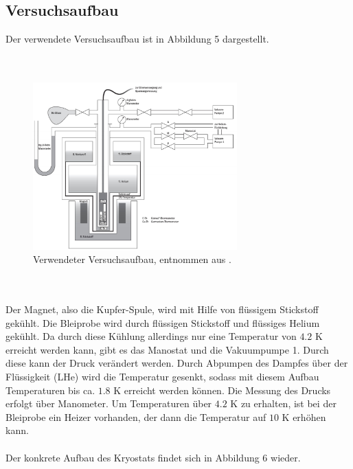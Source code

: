\documentclass[german,  %
parskip=full,  %
]{scrartcl}
\begin{document}
\subsection{Versuchsaufbau}
Der verwendete Versuchsaufbau ist in Abbildung 5 dargestellt.
\\\\\
\begin{figure}[h!]
\centering
\includegraphics[width=0.7\textwidth]{aufbau}
\caption{Verwendeter Versuchsaufbau, entnommen aus \cite{3}.}
\end{figure}
\\\\
Der Magnet, also die Kupfer-Spule, wird mit Hilfe von flüssigem Stickstoff gekühlt. Die Bleiprobe wird durch flüssigen Stickstoff und flüssiges Helium gekühlt. Da durch diese Kühlung allerdings nur eine Temperatur von $4.2$ K erreicht werden kann, gibt es das Manostat und die Vakuumpumpe 1. Durch diese kann der Druck verändert werden. Durch Abpumpen des Dampfes über der Flüssigkeit (LHe) wird die Temperatur gesenkt, sodass mit diesem Aufbau Temperaturen bis ca. $1.8$ K erreicht werden können. Die Messung des Drucks erfolgt über Manometer. Um Temperaturen über $4.2$ K zu erhalten, ist bei der Bleiprobe ein Heizer vorhanden, der dann die Temperatur auf $10$ K erhöhen kann.
\\\\
Der konkrete Aufbau des Kryostats findet sich in Abbildung 6 wieder.
\end{document}
